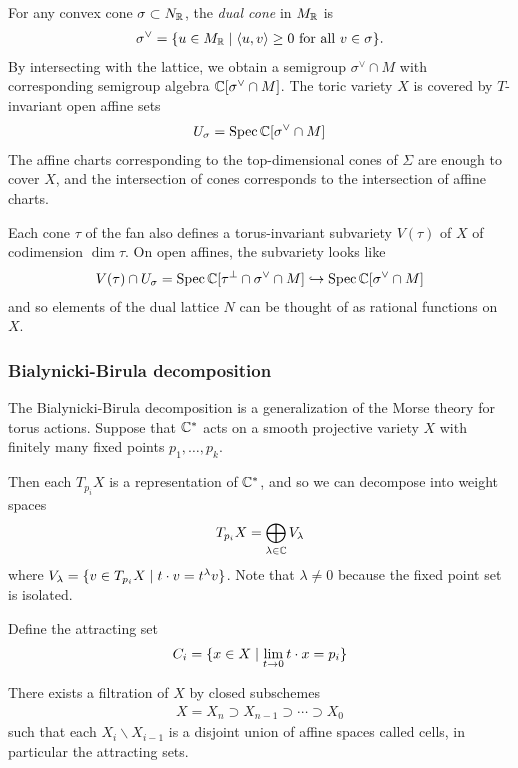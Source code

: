 \hfill

For any convex cone $\sigma \subset N_{\mathbb{R}}$, the \emph{dual cone} in $M_{\mathbb{R}}$ is \begin{align*}
    \sigma^\vee = \{u\in M_{\mathbb{R}} \mid \langle u,v\rangle \geq 0 \text{ for all } v\in \sigma\}.
\end{align*} By intersecting with the lattice, we obtain a semigroup $\sigma^\vee \cap M$
with corresponding semigroup algebra $\mathbb{C}[\sigma^\vee \cap M]$. The toric variety $X$
is covered by $T$-invariant open affine sets \begin{align*}
    U_\sigma = \operatorname{Spec} \mathbb{C}[\sigma^\vee \cap M]
\end{align*} The affine charts corresponding to the top-dimensional cones of $\Sigma$ 
are enough to cover $X$, and the intersection of cones corresponds to the intersection of
affine charts.

\hfill

Each cone $\tau$ of the fan also defines a torus-invariant subvariety $V(\tau)$ of $X$ of codimension $\dim \tau$.
On open affines, the subvariety looks like \begin{align*}
    V(\tau) \cap U_\sigma = \operatorname{Spec} \mathbb{C}[\tau^{\perp} \cap \sigma^\vee \cap M] \hookrightarrow \operatorname{Spec} \mathbb{C}[\sigma^\vee \cap M]
\end{align*} and so elements of the dual lattice $N$ can be thought of as rational functions on $X$.
\subsubsection{Bialynicki-Birula decomposition}
The Bialynicki-Birula decomposition is a 
generalization of the Morse theory for torus actions. Suppose 
that $\mathbb{C}^*$ acts on a smooth projective variety $X$ with finitely 
many fixed points $p_1,\ldots,p_k$. 

\hfill

Then each $T_{p_i}X$ is a representation of $\mathbb{C}^*$, and so we can decompose
into weight spaces \begin{align*}
    T_{p_i}X = \bigoplus_{\lambda\in \mathbb{C}} V_\lambda
\end{align*} where $V_\lambda = \{v\in T_{p_i}X \mid t\cdot v = t^\lambda v\}$.
Note that $\lambda\neq 0 $ because the fixed point set is isolated.

Define the attracting set \begin{align*}
    C_i = \{x\in X \mid \lim_{t\to 0} t\cdot x = p_i\}
\end{align*} 

\begin{theorem}
    There exists a filtration of $X$ by closed subschemes \begin{align*}
        X = X_n \supset X_{n-1} \supset \cdots \supset X_0 
    \end{align*} such that 
    each $X_i \backslash X_{i-1}$ is a disjoint union of affine spaces called cells, 
    in particular the attracting sets.
\end{theorem}

